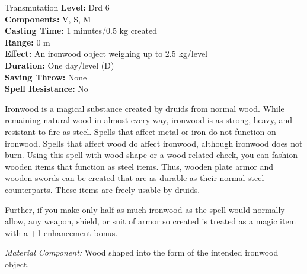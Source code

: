{Transmutation}
{
	\textbf{Level:}
	Drd 6\\
	\textbf{Components:}
	V, S, M\\
	\textbf{Casting Time:}
	1 minutes/0.5 kg created\\
	\textbf{Range:}
	0 m\\
	\textbf{Effect:}
	An ironwood object weighing up to 2.5 kg/level\\
	\textbf{Duration:}
	One day/level (D)\\
	\textbf{Saving Throw:}
	None\\
	\textbf{Spell Resistance:}
	No\\
}
{
	Ironwood is a magical substance created by druids from normal wood. While remaining natural wood in almost every way, ironwood is as strong, heavy, and resistant to fire as steel. Spells that affect metal or iron do not function on ironwood. Spells that affect wood do affect ironwood, although ironwood does not burn. Using this spell with wood shape or a wood-related  check, you can fashion wooden items that function as steel items. Thus, wooden plate armor and wooden swords can be created that are as durable as their normal steel counterparts. These items are freely usable by druids.

	Further, if you make only half as much ironwood as the spell would normally allow, any weapon, shield, or suit of armor so created is treated as a magic item with a +1 enhancement bonus.

	\textit{Material Component:}
	Wood shaped into the form of the intended ironwood object.

}
